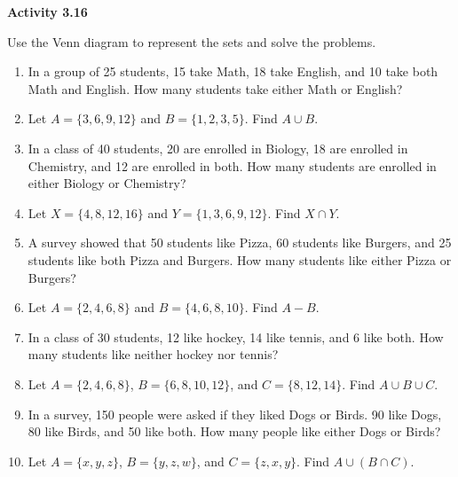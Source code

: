 \vspace{0.3ex}
\noindent\textbf{Activity 3.16}

\vspace{0.2ex}

Use the Venn diagram to represent the sets and solve the problems.

\begin{enumerate}[label=\color{blue}\arabic*.]
    \item In a group of 25 students, 15 take Math, 18 take English, and 10 take both Math and English. How many students take either Math or English?
    \item Let \( A = \{3, 6, 9, 12\} \) and \( B = \{1, 2, 3, 5\} \). Find \( A \cup B \).
    \item In a class of 40 students, 20 are enrolled in Biology, 18 are enrolled in Chemistry, and 12 are enrolled in both. How many students are enrolled in either Biology or Chemistry?
    \item Let \( X = \{4, 8, 12, 16\} \) and \( Y = \{1, 3, 6, 9, 12\} \). Find \( X \cap Y \).
    \item A survey showed that 50 students like Pizza, 60 students like Burgers, and 25 students like both Pizza and Burgers. How many students like either Pizza or Burgers?
    \item Let \( A = \{2, 4, 6, 8\} \) and \( B = \{4, 6, 8, 10\} \). Find \( A - B \).
    \item In a class of 30 students, 12 like hockey, 14 like tennis, and 6 like both. How many students like neither hockey nor tennis?
    \item Let \( A = \{2, 4, 6, 8\} \), \( B = \{6, 8, 10, 12\} \), and \( C = \{8, 12, 14\} \). Find \( A \cup B \cup C \).
    \item In a survey, 150 people were asked if they liked Dogs or Birds. 90 like Dogs, 80 like Birds, and 50 like both. How many people like either Dogs or Birds?
    \item Let \( A = \{x, y, z\} \), \( B = \{y, z, w\} \), and \( C = \{z, x, y\} \). Find \( A \cup (B \cap C) \).
\end{enumerate}
